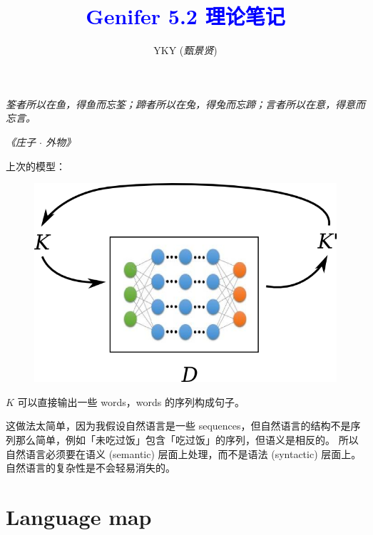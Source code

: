 \documentclass[12pt]{article}
\title{\textcolor{blue}{Genifer 5.2 理论笔记}}
\author{YKY (\textit{甄景贤})}
\newcommand{\tab}{\hspace*{1cm}}
\begin{document}
\tab\tab\tab \parbox{9cm}{\textit{筌者所以在鱼，得鱼而忘筌；蹄者所以在兔，得兔而忘蹄；言者所以在意，得意而忘言。}}
\begin{flushright}
\textit{《庄子 $\cdot$ 外物》} \hspace*{2cm}
\end{flushright}


{\let\newpage\relax\maketitle}

\maketitle
\setlength{\parindent}{0em}
\setlength{\parskip}{1.5ex plus0.5ex minus1.2ex}

上次的模型：
\begin{figure}[H]
\centering
\includegraphics[scale=0.75]{reasoner-model.png}
\end{figure}
$K$ 可以直接输出一些 words，words 的序列构成句子。

这做法太简单，因为我假设自然语言是一些 sequences，但自然语言的结构不是序列那么简单，例如「未吃过饭」包含「吃过饭」的序列，但语义是相反的。 所以自然语言必须要在语义 (semantic) 层面上处理，而不是语法 (syntactic) 层面上。 自然语言的复杂性是不会轻易消失的。

\section{Language map}
\end{document}
